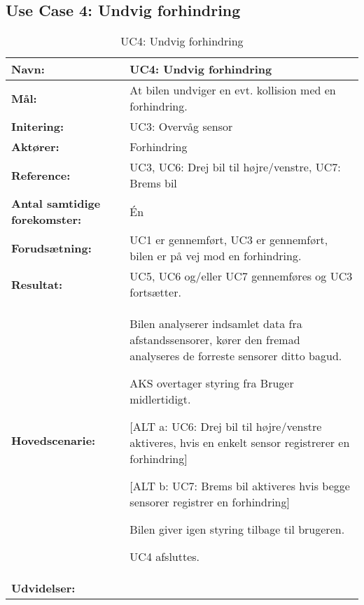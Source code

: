 \subsection{Use Case 4: Undvig forhindring}
\begin{table}[h]
\begin{tabularx}{\textwidth}{| L{3.3 cm} | Z |} \hline

\textbf{Navn:} 						& UC4: Undvig forhindring											\\ \hline
\textbf{Mål:}						& At bilen undviger en evt. kollision med en forhindring.	\\ \hline
\textbf{Initering:}					& UC3: Overvåg sensor 										\\ \hline
\textbf{Aktører:} 					& Forhindring 												\\ \hline
\textbf{Reference:} 				& UC3, UC6: Drej bil til højre/venstre, UC7: Brems bil 		\\ \hline
\textbf{Antal samtidige forekomster:} & Én 														\\ \hline
\textbf{Forudsætning:} 				& UC1 er gennemført, UC3 er gennemført, 
									  bilen er på vej mod en forhindring. 						\\ \hline
\textbf{Resultat:}					& UC5, UC6 og/eller UC7 gennemføres og UC3 fortsætter. 		\\ \hline
\textbf{Hovedscenarie:}				& 

\begin{packed_enum}
	\item Bilen analyserer indsamlet data fra afstandssensorer, kører den fremad analyseres de forreste sensorer ditto bagud.
	\item AKS overtager styring fra Bruger midlertidigt.
	\item 
		\begin{packed_item}\itemsep1pt \parskip0pt 
			\item {[}ALT a: UC6: Drej bil til højre/venstre aktiveres, hvis en enkelt sensor registrerer en forhindring{]}
			\item {[}ALT b: UC7: Brems bil aktiveres hvis begge sensorer registrer en forhindring{]}
		\end{packed_item}
	\item Bilen giver igen styring tilbage til brugeren.
	\item UC4 afsluttes.
\end{packed_enum} 																				\\ \hline
	\textbf{Udvidelser:}				&   													\\ \hline
\end{tabularx}
\caption{UC4: Undvig forhindring}
\label{tbl:UC4}
\end{table}